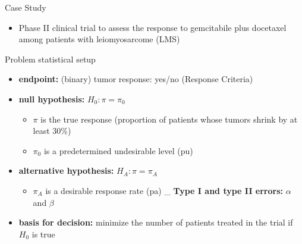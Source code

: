 \documentclass{beamer}
\begin{document}
\begin{frame}[fragile]{Case Study}

\begin{itemize}
\itemsep1pt\parskip0pt
\item
  Phase II clinical trial to assess the response to gemcitabile plus
  docetaxel among patients with leiomyosarcome (LMS)
\end{itemize}

\end{frame}



\begin{frame}{Problem statistical setup}

\begin{itemize}
\itemsep1pt\parskip0pt
\item
  \textbf{endpoint:} (binary) tumor response: yes/no (Response Criteria)
\item
  \textbf{null hypothesis:} \(H_0: \pi = \pi_0\)

  \begin{itemize}
  \itemsep1pt\parskip0pt
  \item
    \(\pi\) is the true response (proportion of patients whose tumors
    shrink by at least 30\%)
  \item
    \(\pi_0\) is a predetermined undesirable level (pu)
  \end{itemize}
\item
  \textbf{alternative hypothesis:} \(H_A: \pi = \pi_A\)

  \begin{itemize}
  \itemsep1pt\parskip0pt
  \item
    \(\pi_A\) is a desirable response rate (pa) \_ \textbf{Type I and
    type II errors:} \(\alpha\) and \(\beta\)
  \end{itemize}
\item
  \textbf{basis for decision:} minimize the number of patients treated
  in the trial if \(H_0\) is true
\end{itemize}

\end{frame}
\end{document}
